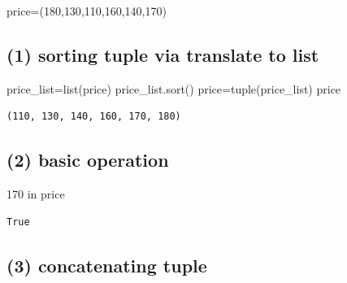 \documentclass[
  letterpaper,
  DIV=11,
  numbers=noendperiod]{scrreprt}
\newenvironment{Shaded}{\begin{snugshade}}{\end{snugshade}}
\newcommand{\BuiltInTok}[1]{\textcolor[rgb]{0.00,0.23,0.31}{#1}}
\newcommand{\DecValTok}[1]{\textcolor[rgb]{0.68,0.00,0.00}{#1}}
\newcommand{\KeywordTok}[1]{\textcolor[rgb]{0.00,0.23,0.31}{#1}}
\newcommand{\NormalTok}[1]{\textcolor[rgb]{0.00,0.23,0.31}{#1}}
\newcommand{\OperatorTok}[1]{\textcolor[rgb]{0.37,0.37,0.37}{#1}}
\begin{document}

\begin{Shaded}
\begin{Highlighting}[]
\NormalTok{price}\OperatorTok{=}\NormalTok{(}\DecValTok{180}\NormalTok{,}\DecValTok{130}\NormalTok{,}\DecValTok{110}\NormalTok{,}\DecValTok{160}\NormalTok{,}\DecValTok{140}\NormalTok{,}\DecValTok{170}\NormalTok{)}
\end{Highlighting}
\end{Shaded}

\subsection*{(1) sorting tuple via translate to
list}\label{sorting-tuple-via-translate-to-list}

\begin{Shaded}
\begin{Highlighting}[]
\NormalTok{price\_list}\OperatorTok{=}\BuiltInTok{list}\NormalTok{(price)}
\NormalTok{price\_list.sort()}
\NormalTok{price}\OperatorTok{=}\BuiltInTok{tuple}\NormalTok{(price\_list)}
\NormalTok{price}
\end{Highlighting}
\end{Shaded}

\begin{verbatim}
(110, 130, 140, 160, 170, 180)
\end{verbatim}

\subsection*{(2) basic operation}\label{basic-operation}

\begin{Shaded}
\begin{Highlighting}[]
\DecValTok{170} \KeywordTok{in}\NormalTok{ price}
\end{Highlighting}
\end{Shaded}

\begin{verbatim}
True
\end{verbatim}

\subsection*{(3) concatenating tuple}\label{concatenating-tuple}
\end{document}

